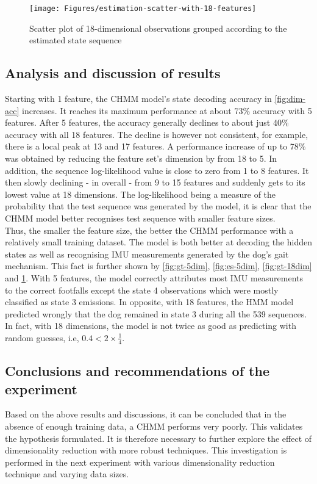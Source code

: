\begin{figure}[ht!]
	\texttt{[image: Figures/estimation-scatter-with-18-features]}
	\caption{Scatter plot of 18-dimensional observations grouped according to the estimated state sequence}
	\label{fig:es-18dim}
\end{figure}

\subsection{Analysis and discussion of results}

Starting with 1 feature, the CHMM model's state decoding accuracy in \ref{fig:dim-acc} increases. It reaches its maximum performance at about 73\% accuracy with 5 features. After 5 features, the accuracy generally declines to about just 40\% accuracy with all 18 features. The decline is however not consistent, for example, there is a local peak at 13 and 17 features.
A performance increase of up to 78\% was obtained by reducing the feature set's dimension by from 18 to 5.
In addition, the sequence log-likelihood value is close to zero from 1 to 8 features. It then slowly declining - in overall - from 9 to 15 features and suddenly gets to its lowest value at 18 dimensions.
The log-likelihood being a measure of the probability that the test sequence was generated by the model, it is clear that the CHMM model better recognises test sequence with smaller feature sizes.\\
Thus, the smaller the feature size, the better the CHMM performance with a relatively small training dataset. The model is both better at decoding the hidden states as well as recognising IMU measurements generated by the dog's gait mechanism.
This fact is further shown by \ref{fig:gt-5dim}, \ref{fig:es-5dim}, \ref{fig:gt-18dim} and \ref{fig:es-18dim}. With 5 features, the model correctly attributes most IMU measurements to the correct footfalls except the state 4 observations which were mostly classified as state 3 emissions. In opposite, with 18 features, the HMM model predicted wrongly that the dog remained in state 3 during all the 539 sequences. In fact, with 18 dimensions, the model is not twice as good as predicting with random guesses, i.e, \(0.4 < 2\times\frac{1}{4}\).

\subsection{Conclusions and recommendations of the experiment}
Based on the above results and discussions, it can be concluded that in the absence of enough training data, a CHMM performs very poorly. This validates the hypothesis formulated. It is therefore necessary to further explore the effect of dimensionality reduction with more robust techniques. This investigation is performed in the next experiment with various dimensionality reduction technique and varying data sizes.


